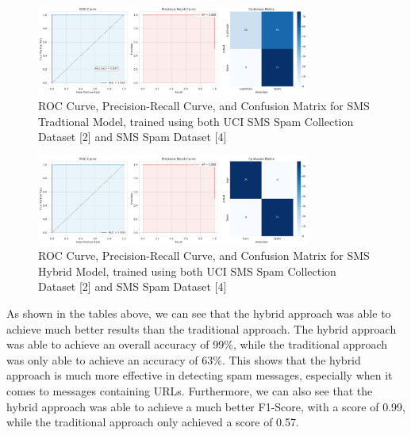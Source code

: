 \documentclass{article}
\begin{document}
\begin{figure}[htbp]
    \centering
    \includegraphics[width=0.8\textwidth]{../analysis/sms/sms_traditional_model_performance.png}
    \caption{ROC Curve, Precision-Recall Curve, and Confusion Matrix for SMS Tradtional Model, trained using both UCI SMS Spam Collection Dataset [2] and SMS Spam Dataset [4]}
    \label{fig:roc_curve_6}
\end{figure}

\begin{figure}[htbp]
    \centering
    \includegraphics[width=0.8\textwidth]{../analysis/sms/sms_hybrid_model_performance.png}
    \caption{ROC Curve, Precision-Recall Curve, and Confusion Matrix for SMS Hybrid Model, trained using both UCI SMS Spam Collection Dataset [2] and SMS Spam Dataset [4]}
    \label{fig:roc_curve_7}
\end{figure}

\noindent
As shown in the tables above, we can see that the hybrid approach was able to achieve much better results than the traditional approach. The hybrid approach was able to achieve an overall accuracy of 99\%, while the traditional approach was only able to achieve an accuracy of 63\%. This shows that the hybrid approach is much more effective in detecting spam messages, especially when it comes to messages containing URLs. Furthermore, we can also see that the hybrid approach was able to achieve a much better F1-Score, with a score of 0.99, while the traditional approach only achieved a score of 0.57.

\newpage
\end{document}
